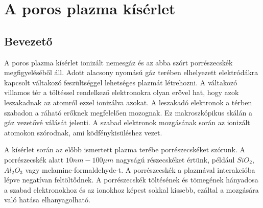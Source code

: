 \chapter{A poros plazma kísérlet}
\section{Bevezető}
	A poros plazma kísérlet ionizált nemesgáz és az abba szórt porrészecskék megfigyeléséből áll.
	Adott alacsony nyomású gáz terében elhelyezett elektródákra kapcsolt váltakozó feszültséggel 
	lehetséges plazmát létrehozni. A váltakozó villamos tér a töltéssel rendelkező elektronokra 
	olyan erővel hat, hogy azok leszakadnak az atomról ezzel ionizálva azokat.
	A leszakadó elektronok a térben szabadon a ráható erőknek megfelelően mozognak.
	Ez makroszkópikus skálán a gáz vezetővé válását jelenti. A szabad elektronok mozgásának
	során az ionizált atomokon szórodnak, ami ködfénykisüléshez vezet. 
	
	A kísérlet során az előbb ismertett plazma terébe porrészecskéket szórunk. A porrészecskék alatt
	$10nm - 100\mu m$ nagyságú részecskéket értünk, például $SiO_2$, $Al_2O_3$ vagy 
	melamine-formaldehyde-t. A porrészecskék a plazmával interakcióba lépve negatívan feltöltődnek.
	A porrészecskék töltésének és tömegének hányadosa a szabad elektronokhoz és az ionokhoz képest
	sokkal kissebb, ezáltal a mozgására való hatása elhanyagolható.
	
